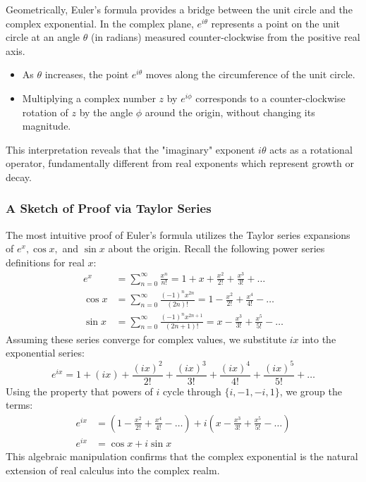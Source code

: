 Geometrically, Euler's formula provides a bridge between the unit circle and the complex exponential. In the complex plane, $e^{i\theta}$ represents a point on the unit circle at an angle $\theta$ (in radians) measured counter-clockwise from the positive real axis. 
\begin{itemize}
    \item As $\theta$ increases, the point $e^{i\theta}$ moves along the circumference of the unit circle.
    \item Multiplying a complex number $z$ by $e^{i\phi}$ corresponds to a counter-clockwise rotation of $z$ by the angle $\phi$ around the origin, without changing its magnitude.
\end{itemize}
This interpretation reveals that the "imaginary" exponent $i\theta$ acts as a rotational operator, fundamentally different from real exponents which represent growth or decay.

\subsubsection{A Sketch of Proof via Taylor Series}

The most intuitive proof of Euler's formula utilizes the Taylor series expansions of $e^x, \cos x,$ and $\sin x$ about the origin. Recall the following power series definitions for real $x$:
\begin{align}
    e^{x} &= \sum_{n=0}^{\infty} \frac{x^n}{n!} = 1 + x + \frac{x^2}{2!} + \frac{x^3}{3!} + \dots \\
    \cos x &= \sum_{n=0}^{\infty} \frac{(-1)^n x^{2n}}{(2n)!} = 1 - \frac{x^2}{2!} + \frac{x^4}{4!} - \dots \\
    \sin x &= \sum_{n=0}^{\infty} \frac{(-1)^n x^{2n+1}}{(2n+1)!} = x - \frac{x^3}{3!} + \frac{x^5}{5!} - \dots
\end{align}
Assuming these series converge for complex values, we substitute $ix$ into the exponential series:
\begin{equation}
    e^{ix} = 1 + (ix) + \frac{(ix)^2}{2!} + \frac{(ix)^3}{3!} + \frac{(ix)^4}{4!} + \frac{(ix)^5}{5!} + \dots
\end{equation}
Using the property that powers of $i$ cycle through $\{i, -1, -i, 1\}$, we group the terms:
\begin{align}
    e^{ix} &= \left( 1 - \frac{x^2}{2!} + \frac{x^4}{4!} - \dots \right) + i \left( x - \frac{x^3}{3!} + \frac{x^5}{5!} - \dots \right) \\
    e^{ix} &= \cos x + i \sin x
\end{align}
This algebraic manipulation confirms that the complex exponential is the natural extension of real calculus into the complex realm.

